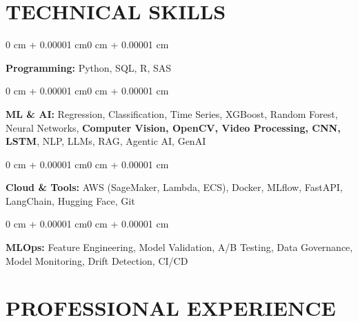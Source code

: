 \documentclass[10pt, letterpaper]{article}
\newenvironment{onecolentry}{
    \begin{adjustwidth}{0 cm + 0.00001 cm}{0 cm + 0.00001 cm}
}{
    \end{adjustwidth}
}
\begin{document}
    \section{TECHNICAL SKILLS}
    \begin{onecolentry}
        \textbf{Programming:} Python, SQL, R, SAS
    \end{onecolentry}
    \vspace{0.03 cm}
    \begin{onecolentry}
        \textbf{ML \& AI:} Regression, Classification, Time Series, XGBoost, Random Forest, Neural Networks, \textbf{Computer Vision, OpenCV, Video Processing, CNN, LSTM}, NLP, LLMs, RAG, Agentic AI, GenAI
    \end{onecolentry}
    \vspace{0.03 cm}
    \begin{onecolentry}
        \textbf{Cloud \& Tools:} AWS (SageMaker, Lambda, ECS), Docker, MLflow, FastAPI, LangChain, Hugging Face, Git
    \end{onecolentry}
    \vspace{0.03 cm}
    \begin{onecolentry}
        \textbf{MLOps:} Feature Engineering, Model Validation, A/B Testing, Data Governance, Model Monitoring, Drift Detection, CI/CD
    \end{onecolentry}

    \section{PROFESSIONAL EXPERIENCE}
\end{document}
